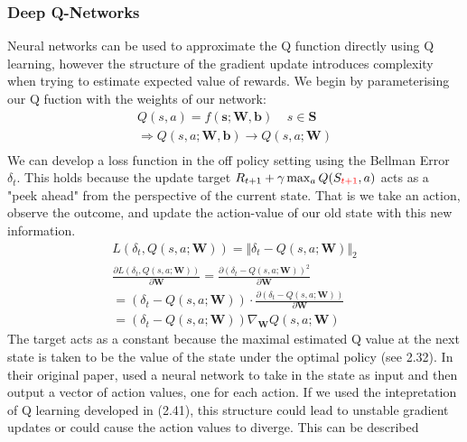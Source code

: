 \subsubsection{Deep Q-Networks}
Neural networks can be used to approximate the Q function directly using Q learning, however the structure
of the gradient update introduces complexity when trying to estimate expected value of rewards. We begin by 
parameterising our Q fuction with the weights of our network:
\begin{equation}
    \begin{gathered}
        Q(s,a)= f(\mathbf{s}; \mathbf{W}, \mathbf{b}) \;\;\;\; s \in \mathbf{S}\\
        \Rightarrow Q(s,a ; \mathbf{W}, \mathbf{b}) \rightarrow Q(s,a ; \mathbf{W}) \\
    \end{gathered}
\end{equation}
We can develop a loss function in the off policy setting using the Bellman Error $\delta_t$.
This holds because the update target $R_{t+1} + \gamma \max_a Q(S_{\textcolor{red}{t+1}},a)$ acts as a
"peek ahead" from the perspective of the current state. That is we take an action, observe the
outcome, and update the action-value of our old state with this new information.
\begin{equation}
    \begin{gathered}
        L(\delta_t, Q(s,a; \mathbf{W})) = \Vert \delta_t - Q(s,a; \mathbf{W}) \Vert_2 \\
        \frac{\partial L(\delta_t, Q(s,a;\mathbf{W} )) }{\partial \mathbf{W} } = \frac{\partial (\delta_t - Q(s,a; \mathbf{W}))^2}{\partial \mathbf{W}}\\
        = (\delta_t - Q(s,a; \mathbf{W})) \cdot \frac{\partial (\delta_t - Q(s,a; \mathbf{W}))}{\partial \mathbf{W}} \\
        = (\delta_t - Q(s,a; \mathbf{W})) \nabla_{\mathbf{W}} Q(s,a; \mathbf{W})
    \end{gathered}
\end{equation}
The target acts as a constant because the maximal estimated Q value at the next state is taken
to be the value of the state under the optimal policy (see 2.32). In their original paper, \cite{Mnih2015}
used a neural network to take in the state as input and then output a vector of action values, 
one for each action. If we used the intepretation of Q learning developed in (2.41), this structure could lead to unstable
gradient updates or could cause the action values to diverge. This can be described
